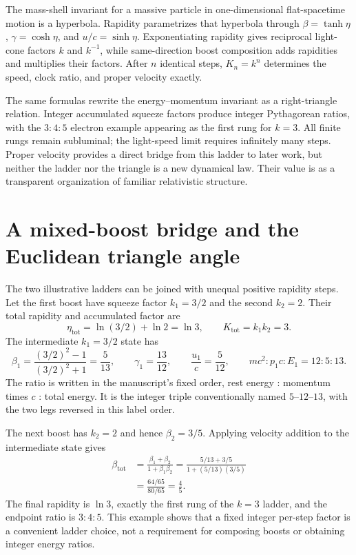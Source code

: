\documentclass[12pt]{article}
\begin{document}
The mass-shell invariant for a massive particle in one-dimensional flat-spacetime motion is a hyperbola. Rapidity parametrizes that hyperbola through $\beta=\tanh\eta$, $\gamma=\cosh\eta$, and $u/c=\sinh\eta$. Exponentiating rapidity gives reciprocal light-cone factors $k$ and $k^{-1}$, while same-direction boost composition adds rapidities and multiplies their factors. After $n$ identical steps, $K_n=k^n$ determines the speed, clock ratio, and proper velocity exactly.

The same formulas rewrite the energy--momentum invariant as a right-triangle relation. Integer accumulated squeeze factors produce integer Pythagorean ratios, with the $3{:}4{:}5$ electron example appearing as the first rung for $k=3$. All finite rungs remain subluminal; the light-speed limit requires infinitely many steps. Proper velocity provides a direct bridge from this ladder to later work, but neither the ladder nor the triangle is a new dynamical law. Their value is as a transparent organization of familiar relativistic structure.

\appendix

\section{A mixed-boost bridge and the Euclidean triangle angle}
\label{app:extensions}

The two illustrative ladders can be joined with unequal positive rapidity steps. Let the first boost have squeeze factor $k_1=3/2$ and the second $k_2=2$. Their total rapidity and accumulated factor are
\begin{equation}
  \eta_{\mathrm{tot}}=\ln(3/2)+\ln2=\ln3,
  \qquad
  K_{\mathrm{tot}}=k_1k_2=3.
  \label{eq:mixed-boost-total}
\end{equation}
The intermediate $k_1=3/2$ state has
\begin{equation}
  \beta_1=\frac{(3/2)^2-1}{(3/2)^2+1}=\frac{5}{13},
  \qquad
  \gamma_1=\frac{13}{12},
  \qquad
  \frac{u_1}{c}=\frac{5}{12},
  \qquad
  mc^2:p_1c:E_1=12:5:13.
  \label{eq:mixed-boost-intermediate}
\end{equation}
The ratio is written in the manuscript's fixed order, rest energy : momentum times $c$ : total energy. It is the integer triple conventionally named $5$--$12$--$13$, with the two legs reversed in this label order.

The next boost has $k_2=2$ and hence $\beta_2=3/5$. Applying velocity addition to the intermediate state gives
\begin{align}
  \beta_{\mathrm{tot}}
  &=\frac{\beta_1+\beta_2}{1+\beta_1\beta_2}
   =\frac{5/13+3/5}{1+(5/13)(3/5)} \\
  &=\frac{64/65}{80/65}=\frac45.
  \label{eq:mixed-boost-velocity}
\end{align}
The final rapidity is $\ln3$, exactly the first rung of the $k=3$ ladder, and the endpoint ratio is $3:4:5$. This example shows that a fixed integer per-step factor is a convenient ladder choice, not a requirement for composing boosts or obtaining integer energy ratios.
\end{document}
